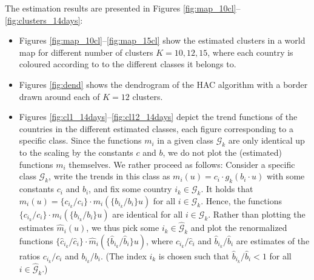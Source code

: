 \documentclass[a4paper,12pt]{article}
\numberwithin{equation}{section}
\begin{document}
The estimation results are presented in Figures \ref{fig:map_10cl}--\ref{fig:clusters_14days}:
\begin{itemize}[leftmargin=0.6cm]
\item Figures \ref{fig:map_10cl}--\ref{fig:map_15cl} show the estimated clusters in a world map for different number of clusters $K =10, 12, 15$, where each country is coloured according to to the different classes it belongs to. 
\item Figures \ref{fig:dend} shows the dendrogram of the HAC algorithm with a border drawn around each of $K = 12$ clusters.
\item Figures \ref{fig:cl1_14days}--\ref{fig:cl12_14days} depict the trend functions of the countries in the different estimated classes, each figure corresponding to a specific class. Since the functions $m_i$ in a given class $\mathcal{G}_k$ are only identical up to the scaling by the constants $c$ and $b$, we do not plot the (estimated) functions $m_i$ themselves. We rather proceed as follows: Consider a specific class $\mathcal{G}_k$,  write the trends in this class as $m_i(u) = c_i \cdot g_k(b_i \cdot u)$ with some constants $c_i$ and $b_i$, and fix some country $i_k \in \mathcal{G}_k$. It holds that $m_i(u) = \{ c_{i_k}/c_i \} \cdot m_i(\{ b_{i_k}/b_i \} u)$ for all $i \in \mathcal{G}_k$. Hence, the functions $\{ c_{i_k}/c_i \} \cdot m_i(\{ b_{i_k}/b_i \} u)$ are identical for all $i \in \mathcal{G}_k$. Rather than plotting the estimates $\hat{m}_i(u)$, we thus pick some $i_k \in \hat{\mathcal{G}}_k$ and plot the renormalized functions $\{ \hat{c}_{i_k}/\hat{c}_i \} \cdot \hat{m}_i(\{ \hat{b}_{i_k}/\hat{b}_i \} u)$, where $\hat{c}_{i_k}/\hat{c}_i$ and $\hat{b}_{i_k}/\hat{b}_i$ are estimates of the ratios $c_{i_k}/c_i$ and $b_{i_k}/b_i$. (The index $i_k$ is chosen such that $\hat{b}_{i_k}/\hat{b}_i < 1$ for all $i \in \hat{\mathcal{G}}_k$.)
\end{itemize}

\end{document}
